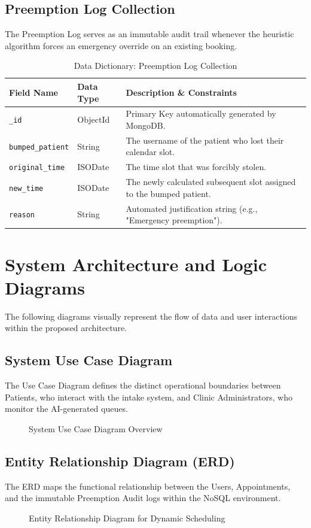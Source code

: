 \documentclass[12pt,a4paper]{report}
\begin{document}
\subsection{Preemption Log Collection}
The Preemption Log serves as an immutable audit trail whenever the heuristic algorithm forces an emergency override on an existing booking.
\begin{table}[H]
\centering
\caption{Data Dictionary: Preemption Log Collection}
\begin{tabularx}{\textwidth}{|l|l|X|}
\hline
\textbf{Field Name} & \textbf{Data Type} & \textbf{Description \& Constraints} \\ \hline
\texttt{\_id} & ObjectId & Primary Key automatically generated by MongoDB. \\ \hline
\texttt{bumped\_patient} & String & The username of the patient who lost their calendar slot. \\ \hline
\texttt{original\_time} & ISODate & The time slot that was forcibly stolen. \\ \hline
\texttt{new\_time} & ISODate & The newly calculated subsequent slot assigned to the bumped patient. \\ \hline
\texttt{reason} & String & Automated justification string (e.g., "Emergency preemption"). \\ \hline
\end{tabularx}
\end{table}

\section{System Architecture and Logic Diagrams}
The following diagrams visually represent the flow of data and user interactions within the proposed architecture.

\subsection{System Use Case Diagram}
The Use Case Diagram defines the distinct operational boundaries between Patients, who interact with the intake system, and Clinic Administrators, who monitor the AI-generated queues.
\begin{figure}[H]
    \centering
    \vspace{8cm}
    \caption{System Use Case Diagram Overview}
\end{figure}

\subsection{Entity Relationship Diagram (ERD)}
The ERD maps the functional relationship between the Users, Appointments, and the immutable Preemption Audit logs within the NoSQL environment.
\begin{figure}[H]
    \centering
    \vspace{8cm}
    \caption{Entity Relationship Diagram for Dynamic Scheduling}
\end{figure}
\end{document}

